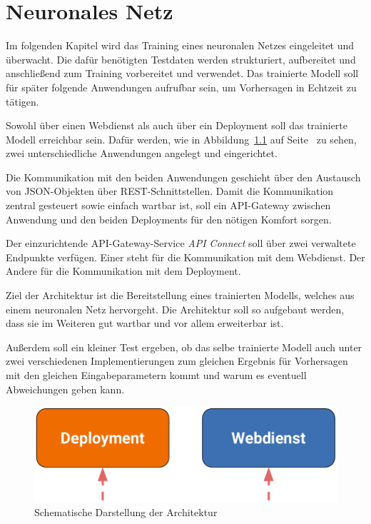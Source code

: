 \chapter{Neuronales Netz}
\label{ch:neuronalesNetz}
Im folgenden Kapitel wird das Training eines neuronalen Netzes eingeleitet und überwacht. Die dafür benötigten Testdaten
werden strukturiert, aufbereitet und anschließend zum Training vorbereitet und verwendet. Das trainierte Modell soll für
später folgende Anwendungen aufrufbar sein, um Vorhersagen in Echtzeit zu tätigen.

Sowohl über einen Webdienst als auch über ein Deployment soll das trainierte Modell erreichbar sein. Dafür werden, wie
in Abbildung~\ref{fig:schematische_architektur} auf Seite~\pageref{fig:schematische_architektur} zu sehen, zwei
unterschiedliche Anwendungen angelegt und eingerichtet.

Die Kommunikation mit den beiden Anwendungen geschieht über den Austausch von JSON-Objekten über REST-Schnittstellen.
Damit die Kommunikation zentral gesteuert sowie einfach wartbar ist, soll ein API-Gateway zwischen Anwendung und den
beiden Deployments für den nötigen Komfort sorgen.

Der einzurichtende API-Gateway-Service \textit{API Connect} soll über zwei verwaltete Endpunkte verfügen. Einer steht
für die Kommunikation mit dem Webdienst. Der Andere für die Kommunikation mit dem Deployment.

Ziel der Architektur ist die Bereitstellung eines trainierten Modells, welches aus einem neuronalen Netz hervorgeht. Die
Architektur soll so aufgebaut werden, dass sie im Weiteren gut wartbar und vor allem erweiterbar ist.

Außerdem soll ein kleiner Test ergeben, ob das selbe trainierte Modell auch unter zwei verschiedenen Implementierungen
zum gleichen Ergebnis für Vorhersagen mit den gleichen Eingabeparametern kommt und warum es eventuell Abweichungen geben
kann.

\begin{figure}[h]
    \centering
    \includegraphics[scale=0.5]{images/kapitel_3/architektur_schematisch.pdf}
    \caption{Schematische Darstellung der Architektur}
    \label{fig:schematische_architektur}
\end{figure}